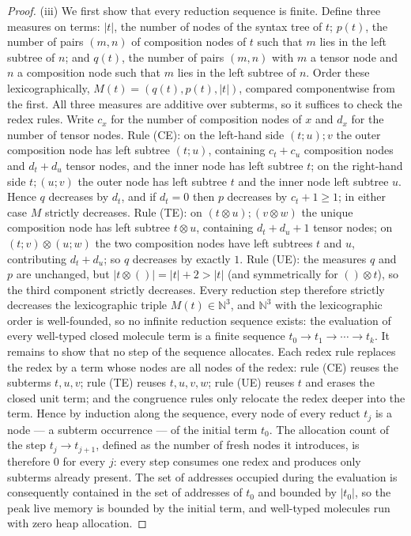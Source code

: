 \begin{proof}
(iii) We first show that every reduction sequence is finite. Define three measures on terms: $|t|$, the number of nodes of the syntax tree of $t$; $p(t)$, the number of pairs $(m, n)$ of composition nodes of $t$ such that $m$ lies in the left subtree of $n$; and $q(t)$, the number of pairs $(m, n)$ with $m$ a tensor node and $n$ a composition node such that $m$ lies in the left subtree of $n$. Order these lexicographically, $M(t) = (q(t), p(t), |t|)$, compared componentwise from the first. All three measures are additive over subterms, so it suffices to check the redex rules. Write $c_x$ for the number of composition nodes of $x$ and $d_x$ for the number of tensor nodes. Rule (CE): on the left-hand side $(t ; u) ; v$ the outer composition node has left subtree $(t ; u)$, containing $c_t + c_u$ composition nodes and $d_t + d_u$ tensor nodes, and the inner node has left subtree $t$; on the right-hand side $t ; (u ; v)$ the outer node has left subtree $t$ and the inner node left subtree $u$. Hence $q$ decreases by $d_t$, and if $d_t = 0$ then $p$ decreases by $c_t + 1 \geq 1$; in either case $M$ strictly decreases.
Rule (TE): on $(t \otimes u) ; (v \otimes w)$ the unique composition node has left subtree $t \otimes u$, containing $d_t + d_u + 1$ tensor nodes; on $(t ; v) \otimes (u ; w)$ the two composition nodes have left subtrees $t$ and $u$, contributing $d_t + d_u$; so $q$ decreases by exactly $1$. Rule (UE): the measures $q$ and $p$ are unchanged, but $|t \otimes ()| = |t| + 2 > |t|$ (and symmetrically for $() \otimes t$), so the third component strictly decreases. Every reduction step therefore strictly decreases the lexicographic triple $M(t) \in \mathbb{N}^3$, and $\mathbb{N}^3$ with the lexicographic order is well-founded, so no infinite reduction sequence exists: the evaluation of every well-typed closed molecule term is a finite sequence $t_0 \longrightarrow t_1 \longrightarrow \cdots \longrightarrow t_k$.
It remains to show that no step of the sequence allocates. Each redex rule replaces the redex by a term whose nodes are all nodes of the redex: rule (CE) reuses the subterms $t, u, v$; rule (TE) reuses $t, u, v, w$; rule (UE) reuses $t$ and erases the closed unit term; and the congruence rules only relocate the redex deeper into the term. Hence by induction along the sequence, every node of every reduct $t_j$ is a node --- a subterm occurrence --- of the initial term $t_0$. The allocation count of the step $t_j \longrightarrow t_{j+1}$, defined as the number of fresh nodes it introduces, is therefore $0$ for every $j$: every step consumes one redex and produces only subterms already present. The set of addresses occupied during the evaluation is consequently contained in the set of addresses of $t_0$ and bounded by $|t_0|$, so the peak live memory is bounded by the initial term, and well-typed molecules run with zero heap allocation.
\end{proof}

